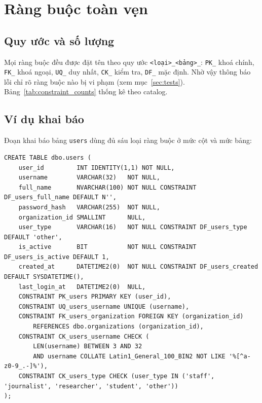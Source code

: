 {\small

}

\section{Ràng buộc toàn vẹn}

\subsection{Quy ước và số lượng}

Mọi ràng buộc đều được đặt tên theo quy ước \texttt{<loại>\_<bảng>\_<ý nghĩa>}:
\texttt{PK\_} khoá chính, \texttt{FK\_} khoá ngoại, \texttt{UQ\_} duy nhất, \texttt{CK\_}
kiểm tra, \texttt{DF\_} mặc định. Nhờ vậy thông báo lỗi chỉ rõ ràng buộc nào bị vi phạm
(xem mục~\ref{sec:tests}). Bảng~\ref{tab:constraint_counts} thống kê theo catalog.

\begin{table}[H]
\centering
\caption{Số lượng ràng buộc theo loại}
\label{tab:constraint_counts}

\end{table}

\subsection{Ví dụ khai báo}

Đoạn khai báo bảng \texttt{users} dùng đủ sáu loại ràng buộc ở mức cột và mức bảng:

\begin{lstlisting}[caption={Bảng users với đủ các loại ràng buộc}, label={lst:users}]
CREATE TABLE dbo.users (
    user_id         INT IDENTITY(1,1) NOT NULL,
    username        VARCHAR(32)   NOT NULL,
    full_name       NVARCHAR(100) NOT NULL CONSTRAINT DF_users_full_name DEFAULT N'',
    password_hash   VARCHAR(255)  NOT NULL,
    organization_id SMALLINT      NULL,
    user_type       VARCHAR(16)   NOT NULL CONSTRAINT DF_users_type DEFAULT 'other',
    is_active       BIT           NOT NULL CONSTRAINT DF_users_is_active DEFAULT 1,
    created_at      DATETIME2(0)  NOT NULL CONSTRAINT DF_users_created DEFAULT SYSDATETIME(),
    last_login_at   DATETIME2(0)  NULL,
    CONSTRAINT PK_users PRIMARY KEY (user_id),
    CONSTRAINT UQ_users_username UNIQUE (username),
    CONSTRAINT FK_users_organization FOREIGN KEY (organization_id)
        REFERENCES dbo.organizations (organization_id),
    CONSTRAINT CK_users_username CHECK (
        LEN(username) BETWEEN 3 AND 32
        AND username COLLATE Latin1_General_100_BIN2 NOT LIKE '%[^a-z0-9_.-]%'),
    CONSTRAINT CK_users_type CHECK (user_type IN ('staff', 'journalist', 'researcher', 'student', 'other'))
);
\end{lstlisting}


